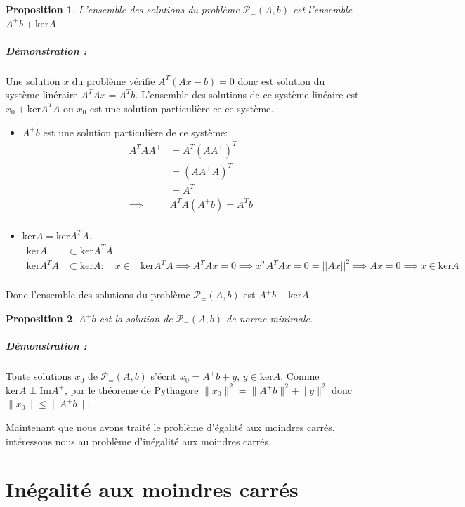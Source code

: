 \documentclass[10pt,a4paper]{article}
\newtheorem{prop}{Proposition}
\begin{document}
\begin{prop}
  L'ensemble des solutions du problème $\mathcal{P}_{=}(A, b)$ est l'ensemble $A^+b + \text{ker}A$.
\end{prop}
\subparagraph{Démonstration :}
  Une solution $x$ du problème vérifie $A^T(Ax-b)=0$ donc est solution du système linéraire $A^TAx = A^Tb$.
  L'ensemble des solutions de ce système linéaire est $x_0 + \text{ker}A^TA$ ou $x_0$ est une solution particulière ce ce système.
\begin{itemize}
  \item $A^+b$ est une solution particulière de ce système:
    \begin{align*}
      A^T A A^+ &= A^T (A A^+)^T \\
        &= (A A^+ A)^T\\
        &= A^T\\
      \implies &A^T A (A^+ b) = A^Tb\\
    \end{align*}
  \item $\text{ker}A = \text{ker}A^TA$.
    \begin{align*}
      \text{ker}A &\subset \text{ker}A^TA\\
      \text{ker}A^TA &\subset \text{ker}A:\quad x \in &\text{ker}A^TA \implies A^TAx = 0 \implies x^TA^TAx = 0 = || Ax ||^2 \implies Ax = 0 \implies x \in \text{ker}A\\
    \end{align*}
\end{itemize}
Donc l'ensemble des solutions du problème $\mathcal{P}_{=}(A, b)$ est $A^+b + \text{ker}A$.

\begin{prop}
  $A^+b$ est la solution de $\mathcal{P}_{=}(A, b)$ de norme minimale.
\end{prop}
\subparagraph{Démonstration :}
  Toute solutions $x_0$ de $\mathcal{P}_{=}(A, b)$ s'écrit $x_0 = A^+b + y$, $y \in \text{ker}A$.
  Comme $\text{ker}A \perp \text{Im}A^+$, par le théoreme de Pythagore $\|x_0 \|^2= \|A^+b \|^2 + \| y \|^2$ donc $\|x_0\| \leq \|A^+b\|$.

Maintenant que nous avons traité le problème d'égalité aux moindres carrés, intéressons nous au problème d'inégalité aux moindres carrés.

\section{Inégalité aux moindres carrés}
\end{document}
